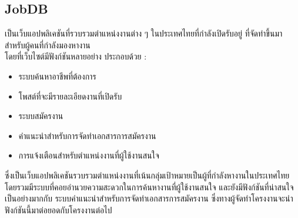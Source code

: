 \subsection{JobDB}
เป็นเว็บแอปพลิเคชันที่รวบรวมตำแหน่งงานต่าง ๆ ในประเทศไทยที่กำลังเปิดรับอยู่ ที่จัดทำขึ้นมาสำหรับผู้คนที่กำลังมองหางาน \\
โดยที่เว็บไซต์มีฟังก์ชันหลายอย่าง ประกอบด้วย :
\begin{itemize}
    \item ระบบค้นหาอาชีพที่ต้องการ
    \item โพสต์ที่จะมีรายละเอียดงานที่เปิดรับ
    \item ระบบสมัครงาน
    \item คำแนะนำสำหรับการจัดทำเอกสารการสมัครงาน
    \item การแจ้งเตือนสำหรับตำแหน่งงานที่ผู้ใช้งานสนใจ
\end{itemize}
\par ซึ่งเป็นเว็บแอปพลิเคชันรวบรวมตำแหน่งงานที่เน้นกลุ่มเป้าหมายเป็นผู้ที่กำลังหางานในประเทศไทย โดยรวมมีระบบที่คอยอำนวยความสะดวกในการค้นหางานที่ผู้ใช้งานสนใจ 
และยังมีฟังก์ชันที่น่าสนใจเป็นอย่างมากกับ ระบบคำแนะนำสำหรับการจัดทำเอกสารการสมัครงาน ซึ่งทางผู้จัดทำโครงงานจะนำฟังก์ชันนี้มาต่อยอดกับโครงงานต่อไป

